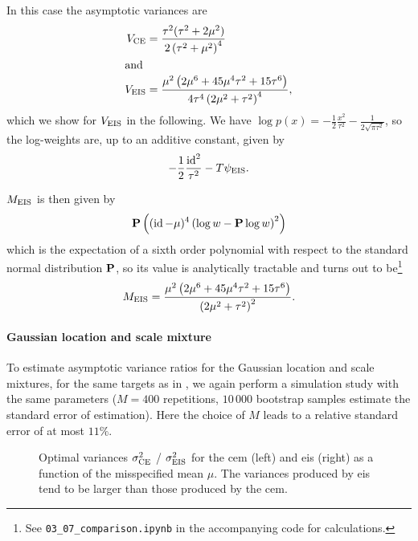 \begin{example}
    In this case the asymptotic variances are
    \begin{align*}
        V_{\ce} &= \frac{\tau^{2}(\tau^{2} + 2\mu^{2})}{2 \left( \tau^{2} + \mu^{2} \right)^{4}}\\
        \intertext{and}
        V_{\eis} &= \frac{\mu^{2} \left(2 \mu^{6} + 45 \mu^{4} \tau^{2} + 15 \tau^{6}\right)}{4 \tau^{4} \left(2 \mu^{2} + \tau^{2}\right)^{4}},
    \end{align*}
    which we show for $V_{\eis}$ in the following. We have $\log p(x) = -\frac{1}{2} \frac{x^{2}}{\tau^{2}} - \frac{1}{2\sqrt{\pi\tau^{2}}}$, so the log-weights are, up to an additive constant, given by
    $$
        - \frac{1}{2} \frac{\id^{2}}{\tau^{2}} - T \psi_{\eis}.
    $$

    $M_{\eis}$ is then given by 
    $$
        \P \left( (\id - \mu)^{4} \left( \log w - \P \log w \right)^{2}  \right)
    $$
    which is the expectation of a sixth order polynomial with respect to the standard normal distribution $\P$, so its value is analytically tractable and turns out to be\footnote{See \texttt{03\_07\_comparison.ipynb} in the accompanying code for calculations.}
    $$ M_{\eis} = \frac{\mu^{2} \left(2 \mu^{6} + 45 \mu^{4} \tau^{2} + 15 \tau^{6}\right)}{\left(2 \mu^{2} + \tau^{2}\right)^{2}}.
    $$

    \paragraph{Gaussian location and scale mixture}
    To estimate asymptotic variance ratios for the Gaussian location and scale mixtures, for the same targets as in , we again perform a simulation study with the same parameters ($M = 400 $ repetitions, $10\,000$ bootstrap samples estimate the standard error of estimation).
    Here the choice of $M$ leads to a relative standard error of at most $11\%$. 
\end{example}
\begin{figure}
    \centering

    \resizebox{\textwidth}{!}{%
    }
    \caption{Optimal variances $\sigma^{2}_{\ce}$ / $\sigma^{2}_\eis$ for the \gls{cem} (left) and \gls{eis} (right) as a function of the misspecified mean $\mu$. The variances produced by \gls{eis} tend to be larger than those produced by the \gls{cem}.}
    \label{fig:cem_eis_sigma2}
\end{figure}

